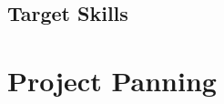 \documentclass{article}
\begin{document}
\subsection{Target Skills}






\section{Project Panning}
\end{document}
